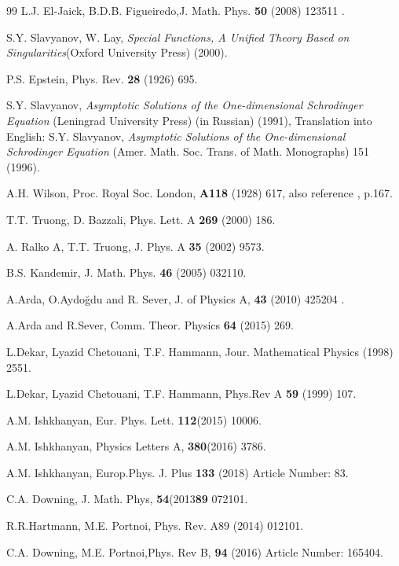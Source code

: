 \documentclass{article}
\begin{document}
\begin{thebibliography}{99}
 L.J. El-Jaick, B.D.B. Figueiredo,J. Math. Phys. \textbf{50} (2008) 123511 .


 S.Y. Slavyanov, W. Lay, \textit{Special Functions, A
Unified Theory Based on Singularities}(Oxford University Press)
(2000).

P.S. Epstein, Phys. Rev. \textbf{28} (1926) 695.

 S.Y. Slavyanov, \textit{Asymptotic Solutions of the
One-dimensional Schrodinger Equation} (Leningrad University Press)
(in Russian) (1991), Translation into English: S.Y. Slavyanov, \textit{%
Asymptotic Solutions of the One-dimensional Schrodinger Equation}
(Amer. Math. Soc. Trans. of Math. Monographs) 151 (1996).



 A.H. Wilson, Proc. Royal Soc. London, \textbf{A118} (1928)
617, also reference \cite {Slavyanov}, p.167.

 T.T. Truong, D. Bazzali, Phys. Lett. A \textbf{269} (2000) 186.

 A. Ralko A, T.T. Truong, J. Phys. A \textbf{35}  (2002) 9573.

 B.S. Kandemir, J. Math. Phys. \textbf{46}  (2005) 032110.

 A.Arda, O.Aydo\u{g}du and R. Sever, J. of Physics A, \textbf{43} (2010) 425204 .

 A.Arda and R.Sever, Comm. Theor. Physics \textbf{64} (2015) 269.
 { 
 L.Dekar, Lyazid Chetouani, T.F. Hammann, Jour. Mathematical Physics  (1998) 2551.

 L.Dekar, Lyazid Chetouani, T.F. Hammann,  Phys.Rev A \textbf{59} (1999) 107.

 A.M. Ishkhanyan, Eur. Phys. Lett. \textbf{112}(2015) 10006.

 A.M. Ishkhanyan, Physics Letters A, \textbf{380}(2016) 3786.

 A.M. Ishkhanyan, Europ.Phys. J. Plus  \textbf{133} (2018) Article Number: 83.

  C.A. Downing, J. Math. Phys, \textbf{54}(2013\textbf{89} 072101.

 R.R.Hartmann, M.E. Portnoi, Phys. Rev. A{89} (2014) 012101.

 C.A. Downing, M.E. Portnoi,Phys. Rev B, \textbf{94} (2016) Article Number: 165404.

}
\end{thebibliography}
\end{document}
